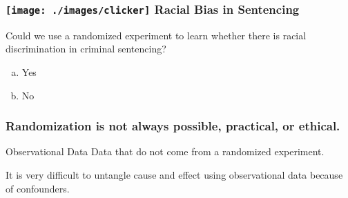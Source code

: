 \documentclass[handout]{beamer}
\begin{document}
\begin{frame}
\frametitle{\texttt{[image: ./images/clicker]} \hfill Racial Bias in Sentencing}
Could we use a randomized experiment to learn whether there is racial discrimination in criminal sentencing?

	\begin{enumerate}[(a)]
		\item Yes
		\item No
	\end{enumerate}
\end{frame}
\begin{frame}
\frametitle{Randomization is not always possible, practical, or ethical.}


\end{frame}





\begin{frame}

\begin{block}{Observational Data}
Data that do not come from a randomized experiment.

\end{block}
\vspace{2em}
\begin{alertblock}{It is very difficult to untangle cause and effect using observational data because of confounders.}
\end{alertblock}


\end{frame}


\end{document}
